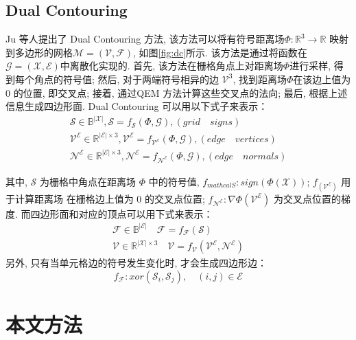\subsection{Dual Contouring}
Ju 等人\cite{ju2002dual}提出了 Dual Contouring 方法, 该方法可以将有符号距离场$\Phi:\mathbb{R}^3\rightarrow \mathbb{R}$ 映射到多边形的网格$\mathcal{M=(V,F)}$, 如图\ref{fig:dc}所示. 该方法是通过将函数在$\mathcal{G=(X,E)}$中离散化实现的. 首先, 该方法在栅格角点上对距离场$\Phi$进行采样, 得到每个角点的符号值; 然后, 对于两端符号相异的边 $\mathcal{V}^3$, 找到距离场$\Phi$在该边上值为 0 的位置, 即交叉点; 接着, 通过QEM 方法计算这些交叉点的法向; 最后, 根据上述信息生成四边形面. Dual Contouring 可以用以下式子来表示：\\
\begin{align}\label{a}
    \mathcal{S}\in \mathbb{B}^{|\mathcal{X}|},  \mathcal{S}=f_{\mathcal{S}}(\Phi,\mathcal{G}),  (grid \quad signs) \\
    \mathcal{V}^\mathcal{E}\in\mathbb{R}^{|\mathcal{E}|\times 3}, \mathcal{V}^\mathcal{E}=f_{\mathcal{V}^\mathcal{E}}(\Phi,\mathcal{G}), (edge\quad vertices)\\
    \mathcal{N}^\mathcal{E}\in\mathbb{R}^{|\mathcal{E}|\times 3},
    \mathcal{N}^\mathcal{E}=f_{\mathcal{N}^\mathcal{E}}(\Phi,\mathcal{G}), (edge\quad normals)
\end{align}

其中, $\mathcal{S}$ 为栅格中角点在距离场 $\Phi$ 中的符号值, $f_{mathcal{S}}: sign(\Phi(\mathcal{X}))$; $f_(\mathcal{V}^\mathcal{E})$ 用于计算距离场 在栅格边上值为 0 的交叉点位置; $f_\mathcal{N^E}:\nabla \Phi(\mathcal{V^E})$  为交叉点位置的梯度. 而四边形面和对应的顶点可以用下式来表示：
\begin{align}
    \mathcal{F}\in \mathbb{B}^{|\mathcal{E}|} \quad \mathcal{F}=f_{\mathcal{F}}(\mathcal{S}) \\
    \mathcal{V} \in \mathbb{R}^{|\mathcal{X}| \times 3} \quad \mathcal{V}=f_{\mathcal{V}}(\mathcal{V}^{\mathcal{E}}, \mathcal{N}^{\mathcal{E}})
\end{align}
另外, 只有当单元格边的符号发生变化时, 才会生成四边形边：
\begin{equation}
    f_{\mathcal{F}}:xor(\mathcal{S}_i, \mathcal{S}_j), \quad (i, j)\in \mathcal{E}
\end{equation}

\section{本文方法}

